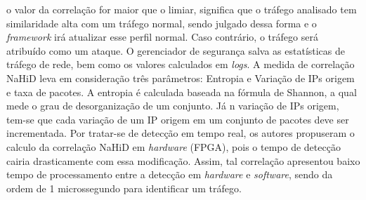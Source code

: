 o  valor da correlação for maior que o limiar, significa que o tráfego analisado tem similaridade alta com um tráfego normal, sendo julgado dessa forma e o \textit{framework} irá atualizar esse perfil normal. Caso contrário, o tráfego será atribuído como um ataque. O gerenciador de segurança  salva as estatísticas de tráfego de rede, bem como os valores calculados em \textit{logs}. A medida de correlação NaHiD leva em consideração três parâmetros: Entropia e Variação de IPs origem e taxa de pacotes. A entropia é calculada baseada na fórmula de Shannon, a qual mede o grau de desorganização de um conjunto. Já n variação de IPs origem, tem-se que cada variação de um IP origem em um conjunto de pacotes deve ser incrementada. Por tratar-se de detecção em tempo real, os autores propuseram o calculo da correlação NaHiD em \textit{hardware} (FPGA), pois o tempo de detecção cairia drasticamente com essa modificação. Assim, tal correlação apresentou baixo tempo de processamento entre a detecção em \textit{hardware} e \textit{software}, sendo da ordem de 1 microssegundo para identificar um tráfego.  
 


   

